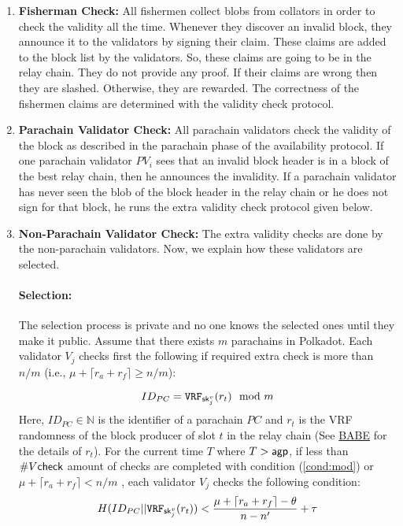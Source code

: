 \begin{enumerate}

      
    \item \textbf{Fisherman Check:} All fishermen collect blobs from collators in order to check the validity all the time. Whenever they discover an invalid block, they announce it to the validators by signing their claim. These claims are added to the block list by the validators. So, these claims are going to be in the relay chain. They do not provide any proof. If their claims are wrong then they are slashed. Otherwise, they are rewarded. The correctness of the fishermen claims are determined with the validity check protocol.
    
    \item \textbf{Parachain Validator Check:} All parachain validators check the validity of the block as described in the parachain phase of the availability protocol. If one parachain validator $PV_i$ sees that an invalid block header is in a block of the best relay chain, then he announces the invalidity. If a parachain validator has never seen the blob of the block header in the relay chain or he does not sign for that block, he runs the extra validity check protocol given below.
    
    \item \textbf{Non-Parachain Validator Check:} The extra validity checks are done by the non-parachain validators. Now, we explain how these validators are selected.
    
    \paragraph{Selection:} The selection process is private and no one knows the selected ones until they make it public. Assume that there exists $m$ parachains in Polkadot. Each validator $V_j$ checks first the following if required extra check is more than $n/m$ (i.e., $\mu + \lceil r_a + r_f \rceil \geq n/m$): 
    
    \begin{equation}\label{cond:mod}
        ID_{PC} = \mathtt{VRF}_{\mathsf{sk}^v_{j}}(r_{t}) \mod m    
    \end{equation}
     Here, $ID_{PC} \in \mathbb{N}$ is the identifier of a parachain $PC$ and $r_{t}$ is the VRF randomness of the block producer of slot $t$ in the relay chain (See \href{http://research.web3.foundation/en/latest/polkadot/BABE/Babe/}{BABE} for the details of $r_t$). For the current time $T$ where $T > \mathsf{agp}$, if  less than $\#V\mathsf{check}$ amount of checks are completed with condition (\ref{cond:mod}) or $\mu + \lceil r_a + r_f \rceil < n/m$ , each validator $V_j$ checks the following condition:
     \begin{equation}\label{cond:time}
        H(ID_{PC} || \mathtt{VRF}_{\mathsf{sk}^v_j}(r_t)) < \frac{\mu + \lceil r_a + r_f \rceil - \theta}{n-n'}+\tau  
    \end{equation}
    

\end{enumerate}
